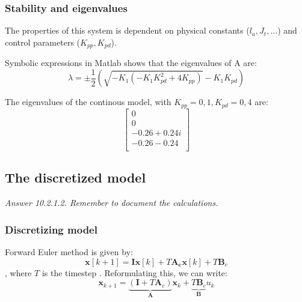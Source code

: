 \subsubsection{Stability and eigenvalues}
The properties of this system is dependent on physical constants ($l_a, J_t, ...$) and control parameters ($K_{pp}, K_{pd}$).

Symbolic expressions in Matlab shows that the eigenvalues of A are:
\begin{equation}
	\lambda = \pm \frac{1}{2} \left( \sqrt{-K_1 (-K_1 K_{pd}^2 + 4  K_{pp})} - K_1  K_{pd} \right)
\end{equation}

The eigenvalues of the continous model, with $K_{pp} = 0,1 , K_{pd} = 0,4$ are:
\begin{equation}\label{eq:lab2_ss_c_eigenvalues_example}
	\begin{bmatrix}
		0 \\ 0 \\ -0.26 + 0.24i \\ -0.26 - 0.24 \\
	\end{bmatrix}
\end{equation}




\subsection{The discretized model}
\textit{Answer 10.2.1.2. Remember to document the calculations.}  \\
\subsubsection{Discretizing model}
Forward Euler method is given by:
\begin{equation}\label{eq:lab2_forward_euler}
	\bm{x}[k + 1] = \bm I \bm x[k] + T\bm{A_c x}[k] + T\bm B_c
\end{equation}, where $ T $ is the timestep .
Reformulating this, we can write:
\begin{equation}\label{eq:lab2_discrete_system}
	\bm{x}_{k + 1} = \underbrace{(\bm I + T \bm A_c)}_{\bm A} \bm{x}_{k} + \underbrace{T \bm B_c}_{\bm B} u_k
\end{equation}

